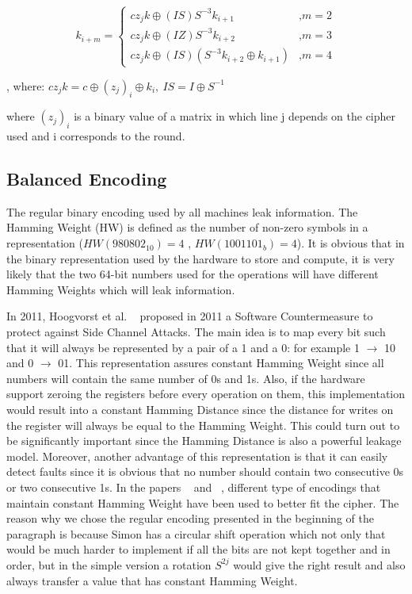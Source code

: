 \documentclass[conference]{IEEEtran}
\begin{document}
\small
\begin{equation}
  k_{i+m} =
  \left\{
  \begin{array}{ll}
    cz_{j}k \oplus (IS)S^{-3}k_{i+1} & \mbox{,} m = 2 \\
    cz_{j}k \oplus (IZ)S^{-3}k_{i+2} & \mbox{,} m = 3 \\
    cz_{j}k \oplus (IS)(S^{-3}k_{i+2} \oplus k_{i+1}) & \mbox{,} m = 4 
  \end{array}
  \right.
\end{equation}

, where: $cz_{j}k = c \oplus (z_{j})_{i} \oplus k_{i} ,\  IS = I \oplus S^{-1}$

\normalsize

where $(z_{j})_{i}$ is a binary value of a matrix in which line j depends on the cipher used and i corresponds to the round.

\subsection{Balanced Encoding}

The regular binary encoding used by all machines leak information. The Hamming Weight (HW) is defined as the number of non-zero symbols in a representation ($HW(980802_{10}) = 4$ , $HW(1001101_{b}) = 4$). It is obvious that in the binary representation used by the hardware to store and compute, it is very likely that the two 64-bit numbers used for the operations will have different Hamming Weights which will leak information.

In 2011, Hoogvorst et al.  ~\cite{Hoogvorst} proposed in 2011 a Software Countermeasure to protect against Side Channel Attacks. The main idea is to map every bit such that it will always be represented by a pair of a 1 and a 0: for example 1 $\rightarrow$ 10 and 0 $\rightarrow$ 01. This representation assures constant Hamming Weight since all numbers will contain the same number of 0s and 1s. Also, if the hardware support zeroing the registers before every operation on them, this implementation would result into a constant Hamming Distance since the distance for writes on the register will always be equal to the Hamming Weight. This could turn out to be significantly important since the Hamming Distance is also a powerful leakage model. Moreover, another advantage of this representation is that it can easily detect faults since it is obvious that no number should contain two consecutive 0s or two consecutive 1s. In the papers ~\cite{BEPrince} and ~\cite{ServantAES}, different type of encodings that maintain constant Hamming Weight have been used to better fit the cipher. The reason why we chose the regular encoding presented in the beginning of the paragraph is because Simon has a circular shift operation which not only that would be much harder to implement if all the bits are not kept together and in order, but in the simple version a rotation $S^{2j}$ would give the right result and also always transfer a value that has constant Hamming Weight.
\end{document}
